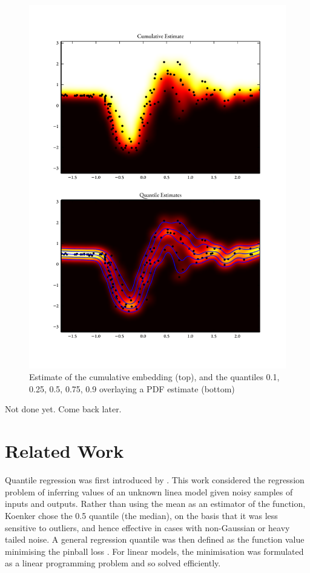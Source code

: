 \documentclass[twoside]{article} \usepackage{aistats2017}
\theoremstyle{definition}
\theoremstyle{remark}
\newcommand{\warn}[1]{{\color{RedOrange} #1}}
\begin{document}
	\begin{figure}
		\begin{center}
			\includegraphics[width=\columnwidth]{figures/mcquantiles}
		\end{center}
		\caption{\small Estimate of the cumulative embedding (top),
			and the quantiles 0.1, 0.25, 0.5, 0.75, 0.9 overlaying a PDF estimate
			(bottom)}
		\label{fig:cembedding}
	\end{figure}

	\warn{Not done yet. Come back later.}
	
\section{Related Work}
\label{sec:related_work}

	Quantile regression was first introduced by \cite{Koenker1978}. This work considered the regression problem of inferring values of an unknown linea model given noisy samples of inputs and outputs. Rather than using the mean as an estimator of the function, Koenker chose the 0.5 quantile (the median), on the basis that it was less sensitive to outliers, and hence effective in cases with non-Gaussian or heavy tailed noise. A general regression quantile was then defined as the function value minimising the pinball loss \citep{Koenker1978}. For linear models, the minimisation was formulated as a linear programming problem and so solved efficiently.
\end{document}
